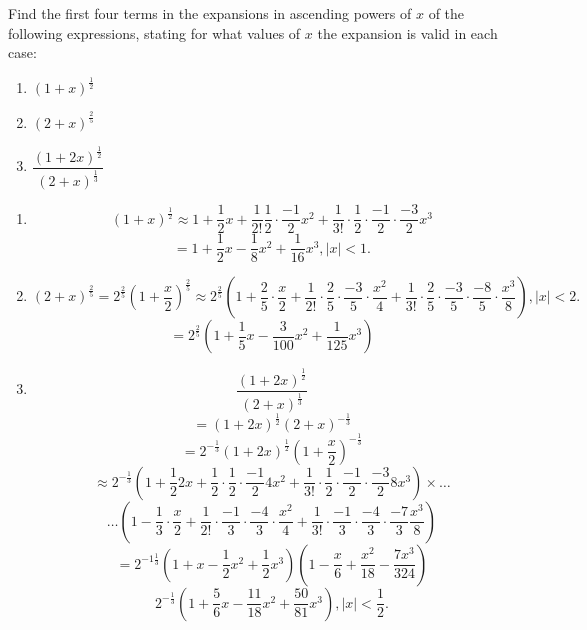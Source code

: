 Find the first four terms in the expansions in ascending powers of $x$ of the following expressions, stating for what values of $x$ the expansion is valid in each case:
\begin{enumerate}
\item $(1+x)^{\frac{1}{2}}$
\item $(2+x)^{\frac{2}{5}}$
\item $\dfrac{(1+2x)^{\frac{1}{2}}}{(2+x)^{\frac{1}{3}}}$
\end{enumerate}
\begin{enumerate}
\item
\[
(1+x)^{\frac{1}{2}} \approx 1 + \frac{1}{2}x + \frac{1}{2!}\frac{1}{2}\cdot\frac{-1}{2}x^2 + \frac{1}{3!}\cdot\frac{1}{2}\cdot\frac{-1}{2}\cdot\frac{-3}{2}x^3
\]
\[
= 1 + \frac{1}{2}x - \frac{1}{8}x^2 + \frac{1}{16}x^3, |x| < 1.
\]
\item
\[
(2+x)^{\frac{2}{5}} = 2^{\frac{2}{5}}(1+\frac{x}{2})^{\frac{2}{5}} \approx 2^{\frac{2}{5}}\left(1 + \frac{2}{5}\cdot\frac{x}{2} + \frac{1}{2!}\cdot\frac{2}{5}\cdot\frac{-3}{5}\cdot\frac{x^2}{4} + \frac{1}{3!}\cdot\frac{2}{5}\cdot\frac{-3}{5}\cdot\frac{-8}{5}\cdot\frac{x^3}{8}\right), |x| < 2.
\]
\[
= 2^{\frac{2}{5}}\left(1 + \frac{1}{5}x - \frac{3}{100}x^2 + \frac{1}{125}x^3\right)
\]
\item
\[
\frac{(1+2x)^{\frac{1}{2}}}{(2+x)^{\frac{1}{3}}}
\]
\[
= (1+2x)^{\frac{1}{2}}(2+x)^{-\frac{1}{3}}
\]
\[
=2^{-\frac{1}{3}}\left(1+2x\right)^{\frac{1}{2}}\left(1+\frac{x}{2}\right)^{-\frac{1}{3}}
\]
\[
\approx 2^{-\frac{1}{3}}\left(1 + \frac{1}{2}2x + \frac{1}{2}\cdot\frac{1}{2}\cdot\frac{-1}{2}4x^2 + \frac{1}{3!}\cdot\frac{1}{2}\cdot\frac{-1}{2}\cdot\frac{-3}{2}8x^3\right)\times \hdots
\]
\[
\hdots \left(1 - \frac{1}{3}\cdot\frac{x}{2} + \frac{1}{2!}\cdot\frac{-1}{3}\cdot\frac{-4}{3}\cdot\frac{x^2}{4}+\frac{1}{3!}\cdot\frac{-1}{3}\cdot\frac{-4}{3}\cdot\frac{-7}{3}\frac{x^3}{8}\right)
\]
\[
=2^{-1\frac{1}{3}}\left(1 + x -\frac{1}{2}x^2 + \frac{1}{2}x^3\right)\left(1 - \frac{x}{6}+ \frac{x^2}{18}-\frac{7x^3}{324}\right)
\]
\[
2^{-\frac{1}{3}}\left(1 + \frac{5}{6}x -\frac{11}{18}x^2 + \frac{50}{81}x^3\right), |x| < \frac{1}{2}.
\]
\end{enumerate}